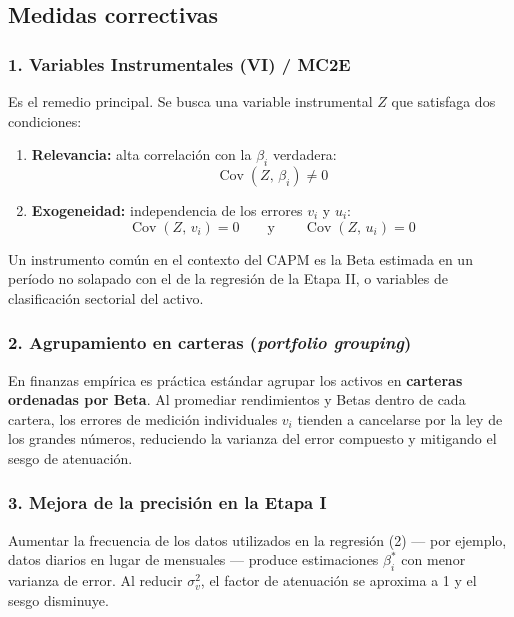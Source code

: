 \documentclass[12pt,letterpaper]{article}
\newcommand{\Cov}{\operatorname{Cov}}
\begin{document}
\subsection{Medidas correctivas}

\subsubsection*{1. Variables Instrumentales (VI) / MC2E}

Es el remedio principal. Se busca una variable instrumental $Z$ que
satisfaga dos condiciones:

\begin{enumerate}[leftmargin=1.8em]
\item \textbf{Relevancia:} alta correlación con la $\beta_{i}$
      verdadera:
      \[
        \Cov(Z,\, \beta_{i}) \neq 0
      \]
\item \textbf{Exogeneidad:} independencia de los errores $v_{i}$ y
      $u_{i}$:
      \[
        \Cov(Z,\, v_{i}) = 0
        \qquad\text{y}\qquad
        \Cov(Z,\, u_{i}) = 0
      \]
\end{enumerate}

Un instrumento común en el contexto del CAPM es la Beta estimada en
un período no solapado con el de la regresión de la Etapa II, o
variables de clasificación sectorial del activo.

\subsubsection*{2. Agrupamiento en carteras (\textit{portfolio grouping})}

En finanzas empírica es práctica estándar agrupar los activos en
\textbf{carteras ordenadas por Beta}. Al promediar rendimientos y
Betas dentro de cada cartera, los errores de medición individuales
$v_{i}$ tienden a cancelarse por la ley de los grandes números,
reduciendo la varianza del error compuesto y mitigando el sesgo de
atenuación.

\subsubsection*{3. Mejora de la precisión en la Etapa I}

Aumentar la frecuencia de los datos utilizados en la regresión (2)
--- por ejemplo, datos diarios en lugar de mensuales --- produce
estimaciones $\beta_{i}^{*}$ con menor varianza de error. Al reducir
$\sigma_{v}^{2}$, el factor de atenuación se aproxima a 1 y el sesgo
disminuye.
\end{document}
